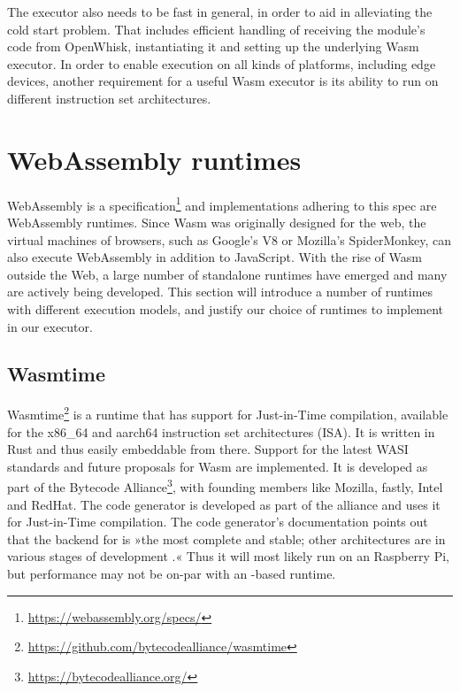The executor also needs to be fast in general, in order to aid in alleviating the cold start problem. That includes efficient handling of receiving the module's code from OpenWhisk, instantiating it and setting up the underlying Wasm executor. In order to enable execution on all kinds of platforms, including edge devices, another requirement for a useful Wasm executor is its ability to run on different instruction set architectures.

\section{WebAssembly runtimes}
\label{section:wasm-runtimes}

WebAssembly is a specification\footnote{\url{https://webassembly.org/specs/}} and implementations adhering to this spec are WebAssembly runtimes. Since Wasm was originally designed for the web, the virtual machines of browsers, such as Google's V8 or Mozilla's SpiderMonkey, can also execute WebAssembly in addition to JavaScript. With the rise of Wasm outside the Web, a large number of standalone runtimes have emerged and many are actively being developed. This section will introduce a number of runtimes with different execution models, and justify our choice of runtimes to implement in our executor.


\subsection{Wasmtime}

Wasmtime\footnote{\url{https://github.com/bytecodealliance/wasmtime}} is a runtime that has support for Just-in-Time compilation, available for the x86\_64 and aarch64 instruction set architectures (ISA). It is written in Rust and thus easily embeddable from there. Support for the latest WASI standards and future proposals for Wasm are implemented.
It is developed as part of the Bytecode Alliance\footnote{\url{https://bytecodealliance.org/}}, with founding members like Mozilla, fastly, Intel and RedHat. The  code generator is developed as part of the alliance and  uses it for Just-in-Time compilation. The code generator's documentation points out that the backend for  is »the most complete and stable; other architectures are in various stages of development \cite{Alliance2021}.« 
Thus it will most likely run on an  Raspberry Pi, but performance may not be on-par with an -based runtime.

